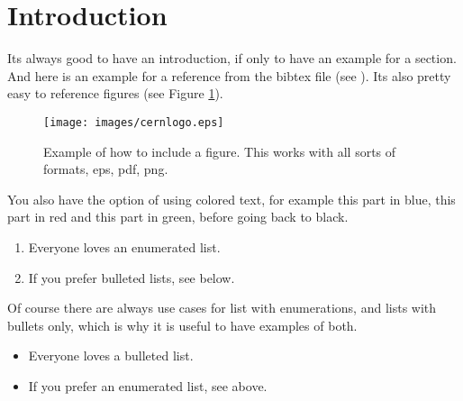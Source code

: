 \section{Introduction}
Its always good to have an introduction, if only to have an example for a section. And here is an example for a reference from the bibtex file (see \cite{einstein}). Its also pretty easy to reference figures (see Figure \ref{fig:examplecernlogo}). \\
\begin{figure}[ht]
\centering
\texttt{[image: images/cernlogo.eps]}
\caption{\label{fig:examplecernlogo} Example of how to include a figure. This works with all sorts of formats, eps, pdf, png.}
\end{figure}

\FloatBarrier


You also have the option of using colored text, for example \color{blue} this part in blue,  \color{red} this part in red  \color{green} and this part in green, before \color{black} going back to black.  

\begin{enumerate}
\item Everyone loves an enumerated list.
\item If you prefer bulleted lists, see below.
\end{enumerate}

Of course there are always use cases for list with enumerations, and lists with bullets only, which is why it is useful to have examples of both.

\begin{itemize}
    \item Everyone loves a bulleted list.
    \item If you prefer an enumerated list, see above.
\end{itemize}